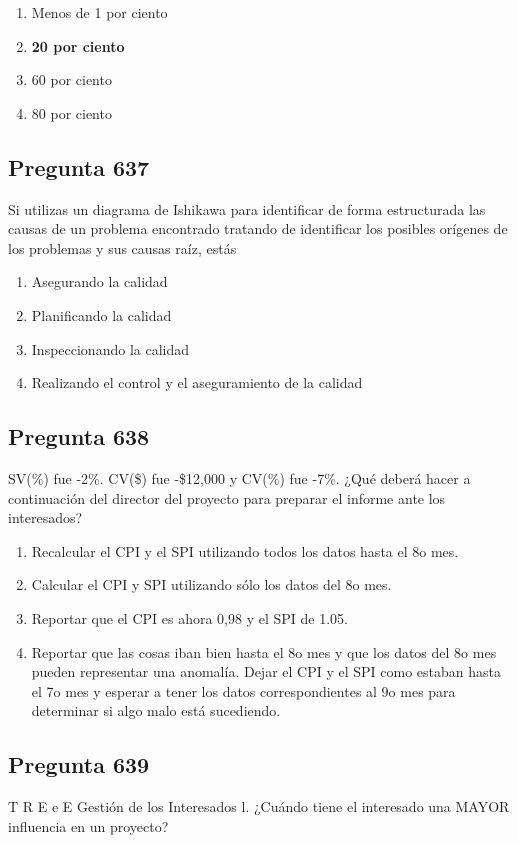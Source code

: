 \documentclass[11pt,a4paper]{article}
\begin{document}
\begin{enumerate}[label=\alph*)]
  \item Menos de 1 por ciento
  \item \textbf{20 por ciento}
  \item 60 por ciento
  \item 80 por ciento
\end{enumerate}

\subsection*{Pregunta 637}
Si utilizas un diagrama de Ishikawa para identificar de forma estructurada las causas de un problema encontrado tratando de identificar los posibles orígenes de los problemas y sus causas raíz, estás

\begin{enumerate}[label=\alph*)]
  \item Asegurando la calidad
  \item Planificando la calidad
  \item Inspeccionando la calidad
  \item Realizando el control y el aseguramiento de la calidad
\end{enumerate}

\subsection*{Pregunta 638}
SV(\%) fue -2\%. CV(\$) fue -\$12,000 y CV(\%) fue -7\%. ¿Qué deberá hacer a continuación del director del proyecto para preparar el informe ante los interesados?

\begin{enumerate}[label=\alph*)]
  \item Recalcular el CPI y el SPI utilizando todos los datos hasta el 8o mes.
  \item Calcular el CPI y SPI utilizando sólo los datos del 8o mes.
  \item Reportar que el CPI es ahora 0,98 y el SPI de 1.05.
  \item Reportar que las cosas iban bien hasta el 8o mes y que los datos del 8o mes pueden representar una anomalía. Dejar el CPI y el SPI como estaban hasta el 7o mes y esperar a tener los datos correspondientes al 9o mes para determinar si algo malo está sucediendo.
\end{enumerate}

\subsection*{Pregunta 639}
T R E e E Gestión de los Interesados l. ¿Cuándo tiene el interesado una MAYOR influencia en un proyecto?
\end{document}
